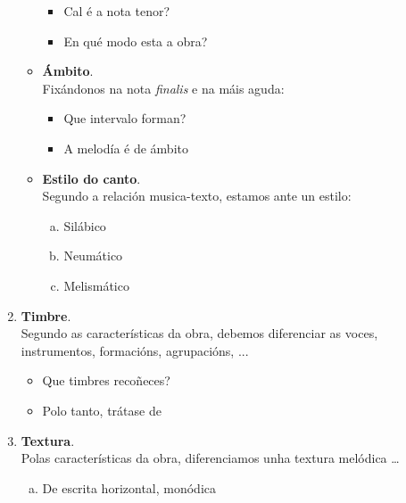 \begin{multicols}{2}
\begin{enumerate}[1.-]
\begin{itemize}
\begin{itemize}
            \item
            Cal é a nota tenor? \dotfill 
            \item
            En qué modo esta a obra? \dotfill
       \end{itemize}
            \item %
            \textbf{Ámbito}. \\
            Fixándonos na nota \textit{finalis} e na máis aguda:
                \begin{itemize}
                    \item
                    Que intervalo forman? \dotfill
                    \item
                    A melodía é de ámbito \dotfill
                \end{itemize}
            \item %
            \textbf{Estilo do canto}. \\ Segundo a relación musica-texto, estamos ante un estilo:
                \begin{enumerate}[a)]
                  \item
                  Silábico \dotfill
                  \item
                  Neumático \dotfill
                  \item
                  Melismático \dotfill
                \end{enumerate}
        \end{itemize}
        \item %
        \textbf{Timbre}. \\
        Segundo as características da obra, debemos diferenciar as voces, instrumentos, formacións, agrupacións, ...
            \begin{itemize}
                \item 
                Que timbres recoñeces? \dotfill
                \item
                Polo tanto, trátase de \dotfill
            \end{itemize}
        \item %
        \textbf{Textura}. \\
        Polas características da obra, diferenciamos unha textura melódica \ldots 
            \begin{enumerate}[a)]
                \item 
                De escrita horizontal, monódica

\end{enumerate}
\end{enumerate}
\end{multicols}

